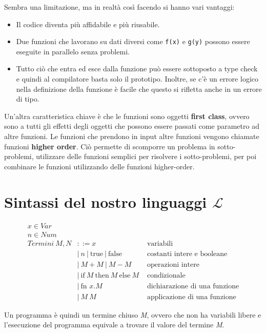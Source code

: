 Sembra una limitazione, ma in realtà così facendo si hanno vari vantaggi:
\begin{itemize}
	\item Il codice diventa più affidabile e più riusabile.
	\item Due funzioni che lavorano su dati diversi come \texttt{f(x)} e \texttt{g(y)} possono essere eseguite in parallelo senza problemi.
	\item Tutto ciò che entra ed esce dalla funzione può essere sottoposto a type check e quindi al compilatore basta solo il prototipo. Inoltre, se c'è un errore logico nella definizione della funzione è facile che questo si rifletta anche in un errore di tipo.
\end{itemize}

\noindent Un'altra caratteristica chiave è che le funzioni sono oggetti \textbf{first class}, ovvero sono a tutti gli effetti degli oggetti che possono essere passati come parametro ad altre funzioni. 
Le funzioni che prendono in input altre funzioni vengono chiamate funzioni \textbf{higher order}.
Ciò permette di scomporre un problema in sotto-problemi, utilizzare delle funzioni semplici per risolvere i sotto-problemi, per poi combinare le funzioni utilizzando delle funzioni higher-order.

\section{Sintassi del nostro linguaggi $\mathcal{L}$}

\begin{align*}
	x \in Var & &\\
	n \in Num & &\\
	Termini \: M, N &::= x &\text{ variabili} \\
								&|\: n \:|\: \text{true} \:|\: \text{false} &\text{ costanti intere e booleane} \\
								&|\: M + M \:|\: M - M &\text{ operazioni intere} \\
								&|\: \text{if} \: M \: \text{then} \: M \: \text{else} \: M &\text{ condizionale} \\
								&|\: \text{fn } x.M &\text{ dichiarazione di una funzione} \\
								&|\: M \: M &\text{ applicazione di una funzione}
\end{align*}

\noindent Un programma è quindi un termine chiuso \textit{M}, ovvero che non ha variabili libere e l'esecuzione del programma equivale a trovare il valore del termine \textit{M}.

